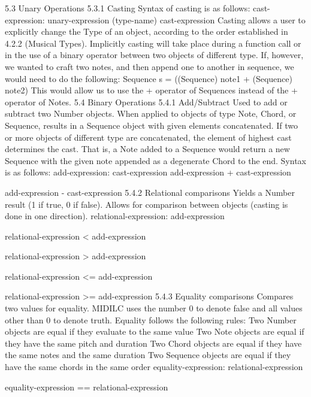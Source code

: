 \documentclass[12pt,A4]{book}
\begin{document}
5.3 Unary Operations
5.3.1 Casting
Syntax of casting is as follows:
cast-expression: unary-expression
(type-name) cast-expression
Casting allows a user to explicitly change the Type of an object, according to the order established in 4.2.2 (Musical Types). Implicitly casting will take place during a function call or in the use of a binary operator between two objects of different type. If, however, we wanted to craft two notes, and then append one to another in sequence, we would need to do the following:
Sequence s = ((Sequence) note1 + (Sequence) note2)
This would allow us to use the + operator of Sequences instead of the + operator of Notes.
5.4 Binary Operations
5.4.1 Add/Subtract
Used to add or subtract two Number objects. When applied to objects of type Note, Chord, or Sequence, results in a Sequence object with given elements concatenated. If two or more objects of different type are concatenated, the element of highest cast determines the cast. That is, a Note added to a Sequence would return a new Sequence with the given note appended as a degenerate Chord to the end.
Syntax is as follows:
add-expression: cast-expression
              add-expression + cast-expression

add-expression - cast-expression
5.4.2 Relational comparisons
Yields a Number result (1 if true, 0 if false). Allows for comparison between objects (casting is done in one direction).
relational-expression:    add-expression

relational-expression < add-expression

relational-expression > add-expression

relational-expression <= add-expression

relational-expression >= add-expression
5.4.3 Equality comparisons
Compares two values for equality. MIDILC uses the number 0 to denote false and all values other than 0 to denote truth. Equality follows the following rules:
Two Number objects are equal if they evaluate to the same value
Two Note objects are equal if they have the same pitch and duration
Two Chord objects are equal if they have the same notes and the same duration
Two Sequence objects are equal if they have the same chords in the same order
equality-expression:    relational-expression

equality-expression == relational-expression
\end{document}
